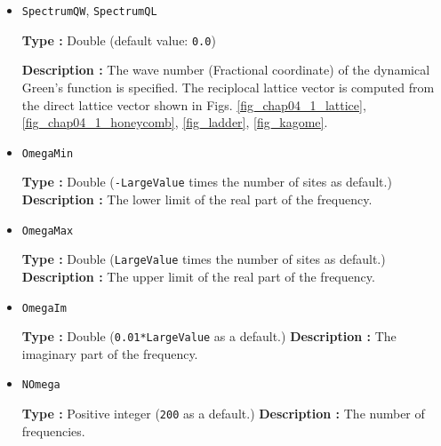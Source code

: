 \begin{itemize}
\item \verb|SpectrumQW|, \verb|SpectrumQL|
  
  {\bf Type :} Double (default value: \verb|0.0|)

  {\bf Description :} The wave number (Fractional coordinate) of the
  dynamical Green's function is specified.
  The reciplocal lattice vector is computed from the
  direct lattice vector shown in Figs.
  \ref{fig_chap04_1_lattice}, \ref{fig_chap04_1_honeycomb},
  \ref{fig_ladder}, \ref{fig_kagome}.

\item \verb|OmegaMin|

    {\bf Type :} Double (\verb|-LargeValue| times the number of sites as default.)
    {\bf Description :} The lower limit of the real part of the frequency.
    
  \item \verb|OmegaMax|

    {\bf Type :} Double (\verb|LargeValue| times the number of sites as default.)
    {\bf Description :} The upper limit of the real part of the frequency.

  \item \verb|OmegaIm|

    {\bf Type :} Double (\verb|0.01*LargeValue| as a default.)
    {\bf Description :} The imaginary part of the frequency.

  \item \verb|NOmega|
  
    {\bf Type :} Positive integer (\verb|200| as a default.)
    {\bf Description :} The number of frequencies.

\end{itemize}

